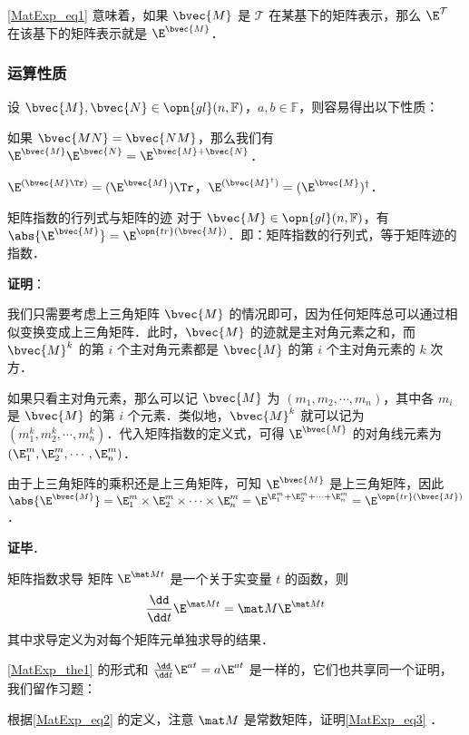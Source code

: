 \autoref{MatExp_eq1} 意味着，如果 $\bvec{M}$ 是 $\mathcal{T}$ 在某基下的矩阵表示，那么 $\E^\mathcal{T}$ 在该基下的矩阵表示就是 $\E^{\bvec{M}}$．

\subsubsection{运算性质}

设 $\bvec{M}, \bvec{N}\in \opn{gl}(n, \mathbb{F})$，$a, b\in\mathbb{F}$，则容易得出以下性质：

如果 $\bvec{MN}=\bvec{NM}$，那么我们有 $\E^{\bvec{M}}\E^{\bvec{N}}=\E^{\bvec{M}+\bvec{N}}$．

$\E^{(\bvec{M}\Tr)}=(\E^{\bvec{M}})\Tr$，$\E^{(\bvec{M}^\dagger)}=({\E^{\bvec{M}}})^\dagger$．

\begin{theorem}{矩阵指数的行列式与矩阵的迹}\label{MatExp_the2}
对于 $\bvec{M}\in\opn{gl}(n, \mathbb{F})$，有 $\abs{\E^{\bvec{M}}}=\E^{\opn{tr}(\bvec{M})}$．即：矩阵指数的行列式，等于矩阵迹的指数．
\end{theorem}

\textbf{证明}：

我们只需要考虑上三角矩阵 $\bvec{M}$ 的情况即可，因为任何矩阵总可以通过相似变换变成上三角矩阵．此时，$\bvec{M}$ 的迹就是主对角元素之和，而 $\bvec{M}^k$ 的第 $i$ 个主对角元素都是 $\bvec{M}$ 的第 $i$ 个主对角元素的 $k$ 次方．

如果只看主对角元素，那么可以记 $\bvec{M}$ 为 $(m_1, m_2,\cdots,m_n)$，其中各 $m_i$ 是 $\bvec{M}$ 的第 $i$ 个元素．类似地，$\bvec{M}^k$ 就可以记为 $(m_1^k, m_2^k,\cdots,m_n^k)$．代入矩阵指数的定义式，可得 $\E^{\bvec{M}}$ 的对角线元素为 $(\E^m_1, \E^m_2,\cdots, \E^m_n)$．

由于上三角矩阵的乘积还是上三角矩阵，可知 $\E^{\bvec{M}}$ 是上三角矩阵，因此 $\abs{\E^{\bvec{M}}}=\E^m_1\times\E^m_2\times\cdots\times\E^m_n=\E^{\E^m_1+\E^m_2+\cdots+\E^m_n}=\E^{\opn{tr}(\bvec{M})}$．

\textbf{证毕}．





\begin{theorem}{矩阵指数求导}\label{MatExp_the1}
矩阵 $\E^{\mat Mt}$ 是一个关于实变量 $t$ 的函数，则
\begin{equation}\label{MatExp_eq3}
\frac{\dd}{\dd t}\E^{\mat Mt}=\mat M\E^{\mat Mt}
\end{equation}
其中求导定义为对每个矩阵元单独求导的结果．
\end{theorem}

\autoref{MatExp_the1} 的形式和 $\frac{\dd}{\dd t}\E^{at}=a\E^{at}$ 是一样的，它们也共享同一个证明，我们留作习题：

\begin{exercise}{}
根据\autoref{MatExp_eq2} 的定义，注意 $\mat M$ 是常数矩阵，证明\autoref{MatExp_eq3} ．
\end{exercise}








